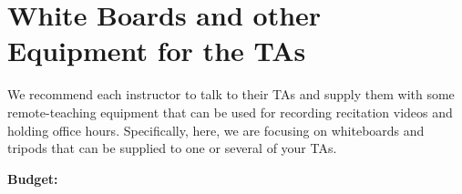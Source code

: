 \chapter{White Boards and other Equipment for the TAs}

\begin{gram}
We recommend each instructor to talk to their TAs and supply them with
some remote-teaching equipment that can be used for recording recitation videos and holding office hours.  
%
Specifically, here, we are focusing on whiteboards and tripods that can be supplied to one or several of your TAs.
%

\textbf{Budget:} 



\end{gram}



